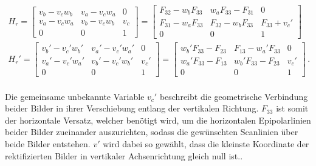 
\begin{gather}
		H_r = 
		\begin{bmatrix}
			v_b-v_cw_b&	v_a-v_cw_a&0\\
			v_a-v_cw_a&v_b-v_cw_b&v_c\\
			0&0&1
		\end{bmatrix} = 
	\begin{bmatrix}
		F_{32}-w_bF_{33}&w_aF_{33}-F_{31}&0\\
		F_{31}-w_aF_{33}&F_{32}-w_bF_{33}&F_{33}+v_c'\\
		0&0&1
	\end{bmatrix}\\
	H_r'=
		\begin{bmatrix}
		v_b'-v_c'w_b'&	v_a'-v_c'w_a'&0\\
		v_a'-v_c'w_a'&v_b'-v_c'w_b'&v_c'\\
		0&0&1
	\end{bmatrix}=
	\begin{bmatrix}
		w_b'F_{33}-F_{23}&F_{13}-w_a'F_{33}&0\\
		w_a'F_{33}-F_{13}&w_b'F_{33}-F_{23}&v_c'\\
		0&0&1
	\end{bmatrix} \, .
\end{gather}\\


Die gemeinsame unbekannte Variable $v_c'$ beschreibt die geometrische Verbindung beider Bilder in ihrer Verschiebung entlang der vertikalen Richtung\cite{ZZ}. $F_ {33}$ ist somit der horizontale Versatz, welcher benötigt wird, um die horizontalen Epipolarlinien beider Bilder zueinander auszurichten, sodass die gewünschten Scanlinien über beide Bilder entstehen. $v'$ wird dabei so gewählt, dass die kleinste Koordinate der rektifizierten Bilder in vertikaler Achsenrichtung gleich null ist.\cite{ZZ}.\\


%

